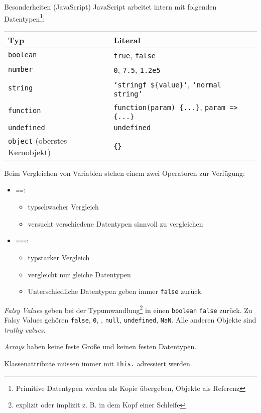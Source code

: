 \begin{bonus}{Besonderheiten (JavaScript)}
    JavaScript arbeitet intern mit folgenden Datentypen\footnote{Primitive Datentypen werden als Kopie übergeben, Objekte als Referenz}:

    \begin{tabular}{|l|l|}
        \hline
        Typ                                   & Literal                                                     \\\hline\hline
        \texttt{boolean}                      & \texttt{true}, \texttt{false}                               \\\hline
        \texttt{number}                       & \texttt{0}, \texttt{7.5}, \texttt{1.2e5}                    \\\hline
        \texttt{string}                       & \texttt{`stringf \$\{value\}`}, \texttt{'normal string'}    \\\hline %
        \texttt{function}                     & \texttt{function(param) \{...\}}, \texttt{param => \{...\}} \\\hline
        \texttt{undefined}                    & \texttt{undefined}                                          \\\hline
        \texttt{object} (oberstes Kernobjekt) & \texttt{\{\}}                                               \\\hline
    \end{tabular}

    Beim Vergleichen von Variablen stehen einem zwei Operatoren zur Verfügung:
    \begin{itemize}
        \item \texttt{==}:
              \begin{itemize}
                  \item typschwacher Vergleich
                  \item versucht verschiedene Datentypen sinnvoll zu vergleichen
              \end{itemize}
        \item \texttt{===}:
              \begin{itemize}
                  \item typstarker Vergleich
                  \item vergleicht nur gleiche Datentypen
                  \item Unterschiedliche Datentypen geben immer \texttt{false} zurück.
              \end{itemize}
    \end{itemize}

    \emph{Falsy Values} geben bei der Typumwandlung\footnote{explizit oder implizit z. B. in dem Kopf einer Schleife} in einen \texttt{boolean} \texttt{false} zurück.
    Zu Falsy Values gehören \texttt{false}, \texttt{0}, \texttt{\ditto\ditto}, \texttt{null}, \texttt{undefined}, \texttt{NaN}.
    Alle anderen Objekte sind \emph{truthy values}.

    \emph{Arrays} haben keine feste Größe und keinen festen Datentypen.

    Klassenattribute müssen immer mit \texttt{this.} adressiert werden.
\end{bonus}

